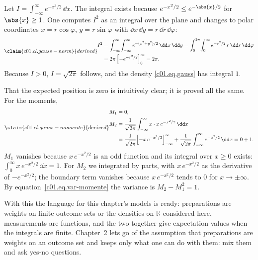 \begin{vertiefung}[id=c01.v3,
    titel={Normalisation and moments of the Gaussian distribution},
    wozu={Example~\ref{c01.ex.gauss} asserts that the Gaussian density is normalised. Here
      this is calculated, together with mean and variance.},
    voraussetzung={Section~\ref{c01.s4}; integrals in two variables, polar coordinates,
      integration by parts. The Core uses only the result.},
    zurueck={The Gaussian density $e^{-x^2/2}/\sqrt{2\pi}$ is normalised, its mean is $0$
      and its variance $1$.}]
  Let $I = \int_{-\infty}^{\infty} e^{-x^2/2}\,\dd x$. The integral exists because
  $e^{-x^2/2} \leq e^{-\abs{x}/2}$ for $\abs{x} \geq 1$. One computes $I^2$ as an
  integral over the plane and changes to polar coordinates $x = r\cos\varphi$,
  $y = r\sin\varphi$ with $\dd x\,\dd y = r\,\dd r\,\dd\varphi$:
  \begin{equation}\label{c01.eq.gauss-norm}\claim{c01.cl.gauss-norm}{derived}
    \begin{aligned}
      I^2 &= \int_{-\infty}^{\infty}\!\int_{-\infty}^{\infty} e^{-(x^2 + y^2)/2}\,\dd x\,\dd y
           = \int_0^{2\pi}\!\int_0^\infty e^{-r^2/2}\, r\,\dd r\,\dd\varphi \\
          &= 2\pi\,\Bigl[-e^{-r^2/2}\Bigr]_0^\infty = 2\pi .
    \end{aligned}
  \end{equation}
  Because $I > 0$, $I = \sqrt{2\pi}$ follows, and the density \eqref{c01.eq.gauss} has
  integral $1$.

  That the expected position is zero is intuitively clear; it is proved all the same. For
  the moments,
  \begin{equation}\label{c01.eq.gauss-momente}\claim{c01.cl.gauss-momente}{derived}
    \begin{aligned}
      M_1 &= 0, \\
      M_2 &= \frac{1}{\sqrt{2\pi}}\int_{-\infty}^{\infty} x\cdot x\,e^{-x^2/2}\,\dd x \\
          &= \frac{1}{\sqrt{2\pi}}\Bigl[-x\,e^{-x^2/2}\Bigr]_{-\infty}^{\infty}
            + \frac{1}{\sqrt{2\pi}}\int_{-\infty}^{\infty} e^{-x^2/2}\,\dd x
          = 0 + 1 .
    \end{aligned}
  \end{equation}
  $M_1$ vanishes because $x\,e^{-x^2/2}$ is an odd function and its integral
  over $x \geq 0$ exists: $\int_0^\infty x\,e^{-x^2/2}\,\dd x = 1$. For $M_2$ we
  integrated by parts, with $x\,e^{-x^2/2}$ as the derivative of $-e^{-x^2/2}$; the
  boundary term vanishes because $x\,e^{-x^2/2}$ tends to $0$ for $x \to \pm\infty$. By
  equation~\eqref{c01.eq.var-momente} the variance is $M_2 - M_1^2 = 1$.
\end{vertiefung}

With this the language for this chapter's models is ready: preparations are weights on
finite outcome sets or the densities on $\mathbb{R}$ considered here, measurements are
functions, and the two together give expectation values when the integrals are finite. Chapter~2 lets go of the
assumption that preparations are weights on an outcome set and keeps only what one can do
with them: mix them and ask yes-no questions.
